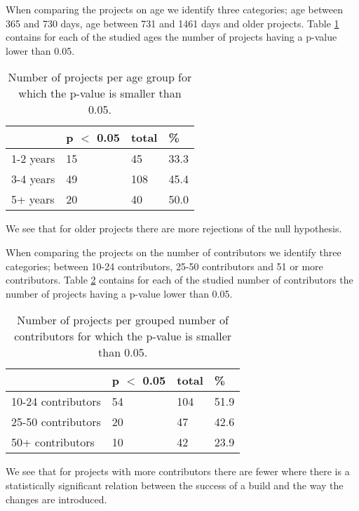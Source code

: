 When comparing the projects on age we identify three categories; age between 365 and 730 days, age between 731 and 1461 days and older projects.
Table \ref{tab:p-for-age} contains for each of the studied ages the number of projects having a p-value lower than 0.05.
\begin{table}[h]
\begin{tabular}{ l | l l l}
 & p $<$ 0.05 & total & \%\\
\hline
1-2 years & 15 & 45 & 33.3\\
3-4 years & 49 & 108 & 45.4 \\
5+ years & 20 & 40 & 50.0
\end{tabular}
\caption{Number of projects per age group for which the p-value is smaller than 0.05.}
\label{tab:p-for-age}
\end{table}
We see that for older projects there are more rejections of the null hypothesis. 

When comparing the projects on the number of contributors we identify three categories; between 10-24 contributors, 25-50 contributors and 51 or more contributors.
Table \ref{tab:p-for-contributors} contains for each of the studied number of contributors the number of projects having a p-value lower than 0.05.
\begin{table}[h]
\begin{tabular}{ l | l l l}
 & p $<$ 0.05 & total & \%\\
\hline
10-24 contributors & 54 & 104 & 51.9\\
25-50 contributors & 20 & 47 & 42.6 \\
50+ contributors & 10 & 42 & 23.9
\end{tabular}
\caption{Number of projects per grouped number of contributors for which the p-value is smaller than 0.05.}
\label{tab:p-for-contributors}
\end{table}
We see that for projects with more contributors there are fewer where there is a statistically significant relation between the success of a build and the way the changes are introduced.

